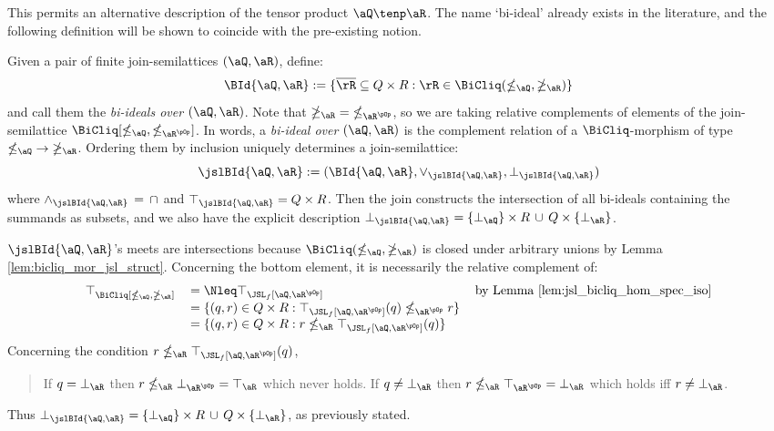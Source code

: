 \documentclass{article}
\begin{document}
This permits an alternative description of the tensor product $\aQ \tenp \aR$. The name `bi-ideal' already exists in the literature, and the following definition will be shown to coincide with the pre-existing notion.

\begin{definition}
\label{def:bi_ideal}
\item
Given a pair of finite join-semilattices $(\aQ,\aR)$, define:
\[
\BId{\aQ,\aR}
:= \{ \overline{\rR} \subseteq Q \times R : \rR \in \BiCliq(\nleq_\aQ,\ngeq_\aR) \}
\]
and call them the \emph{bi-ideals over $(\aQ,\aR)$}. Note that $\ngeq_\aR \; = \; \nleq_{\aR^{\pOp}}$, so we are taking relative complements of elements of the join-semilattice $\BiCliq[\nleq_\aQ,\nleq_{\aR^{\pOp}}]$. In words, a \emph{bi-ideal over $(\aQ,\aR)$} is the complement relation of a $\BiCliq$-morphism of type $\nleq_\aQ \; \to \; \ngeq_\aR$. Ordering them by inclusion uniquely determines a join-semilattice:
\[
\jslBId{\aQ,\aR} := (\BId{\aQ,\aR},\lor_{\jslBId{\aQ,\aR}},\bot_{\jslBId{\aQ,\aR}})
\]
where $\land_{\jslBId{\aQ,\aR}} \, = \, \cap$ and $\top_{\jslBId{\aQ,\aR}} = Q \times R$. Then the join constructs the intersection of all bi-ideals containing the summands as subsets, and we also have the explicit description $\bot_{\jslBId{\aQ,\aR}} = \{ \bot_\aQ \} \times R \, \cup \, Q \times \{ \bot_\aR \}$. \endbox
\end{definition}

\begin{note}
$\jslBId{\aQ,\aR}$'s meets are intersections because $\BiCliq(\nleq_\aQ,\ngeq_\aR)$ is closed under arbitrary unions by Lemma \ref{lem:bicliq_mor_jsl_struct}. Concerning the bottom element, it is necessarily the relative complement of:
\[
\begin{tabular}{lll}
$\top_{\BiCliq[\nleq_\aQ,\ngeq_\aR]}$
&
$= \Nleq \top_{\JSL_f[\aQ,\aR^{\pOp}]}$
& by Lemma \ref{lem:jsl_bicliq_hom_spec_iso}
\\&
$= \{ (q,r) \in Q \times R : \top_{\JSL_f[\aQ,\aR^{\pOp}]}(q) \nleq_{\aR^{\pOp}} r \}$
\\&
$= \{ (q,r) \in Q \times R : r \nleq_\aR \top_{\JSL_f[\aQ,\aR^{\pOp}]}(q) \}$
\end{tabular}
\]
Concerning the condition $r \nleq_\aR \top_{\JSL_f[\aQ,\aR^{\pOp}]}(q)$,
\begin{quote}
If $q = \bot_\aR$ then $r \nleq_\aR \bot_{\aR^{\pOp}} = \top_\aR$ which never holds.
\qquad
If $q \neq \bot_\aR$ then $r \nleq_\aR \top_{\aR^{\pOp}} = \bot_\aR$ which holds iff $r \neq \bot_\aR$.
\end{quote}
Thus $\bot_{\jslBId{\aQ,\aR}} = \{ \bot_\aQ \} \times R \, \cup\, Q \times \{ \bot_\aR \}$, as previously stated. \endbox
\end{note}
\end{document}

